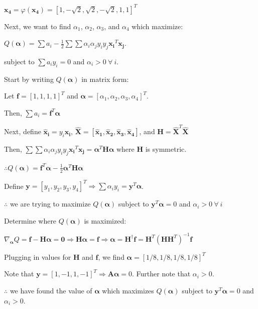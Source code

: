 \documentclass[fleqn]{article}
\begin{document}
\begin{enumerate}
	$\mathbf{x_4} = \varphi(\mathbf{x_4}) = [1,-\sqrt{2},\sqrt{2},-\sqrt{2},1,1]^T$
	
	Next, we want to find $\alpha_1$, $\alpha_2$, $\alpha_3$, and $\alpha_4$ which maximize:
	
	$Q(\boldsymbol{\alpha}) = \sum{a_i} - \frac{1}{2}\sum{\sum{\alpha_i\alpha_jy_iy_j\mathbf{x_i}^T\mathbf{x_j}}}$.
	
	subject to $\sum{a_iy_i} = 0$ and $\alpha_i > 0\ \forall\ i$.
	
	Start by writing $Q(\boldsymbol{\alpha})$ in matrix form:

	Let $\mathbf{f} = [1,1,1,1]^T$ and $\boldsymbol{\alpha} = [\alpha_1, \alpha_2, \alpha_3, \alpha_4]^T$.
	
	Then, $\sum{a_i} = \mathbf{f}^T\boldsymbol{\alpha}$
	
	Next, define $\mathbf{\hat{x}_i} = y_i\mathbf{x_i}$, $\mathbf{\hat{X}} = [\mathbf{\hat{x}_1},\mathbf{\hat{x}_2}, \mathbf{\hat{x}_3}, \mathbf{\hat{x}_4}]$, and $\mathbf{H} = \mathbf{\hat{X}}^T\mathbf{\hat{X}}$
	
	Then, $\sum{\sum{\alpha_i\alpha_jy_iy_j\mathbf{x_i}^T\mathbf{x_j}}} = \boldsymbol{\alpha}^T\mathbf{H}\boldsymbol{\alpha}$ where $\mathbf{H}$ is symmetric.
	
	$\therefore Q(\boldsymbol{\alpha}) = \mathbf{f}^T\boldsymbol{\alpha} - \frac{1}{2}\boldsymbol{\alpha}^T\mathbf{H}\boldsymbol{\alpha}$
	
	Define $\mathbf{y} = [y_1, y_2, y_3, y_4]^T \Rightarrow \sum{\alpha_iy_i} = \mathbf{y}^T\boldsymbol{\alpha}$.
	
	$\therefore$ we are trying to maximize $Q(\boldsymbol{\alpha})$ subject to $\mathbf{y}^T\boldsymbol{\alpha} = 0$ and $\alpha_i > 0\ \forall\ i$
	
	Determine where $Q(\boldsymbol{\alpha})$ is maximized:
	
	$\nabla_{\boldsymbol{\alpha}}Q = \mathbf{f} - \mathbf{H}\boldsymbol{\alpha} = \mathbf{0} \Rightarrow \mathbf{H}\boldsymbol{\alpha} = \mathbf{f} \Rightarrow \boldsymbol{\alpha} = \mathbf{H}^{\dag}\mathbf{f} = \mathbf{H}^T(\mathbf{H}\mathbf{H}^T)^{-1}\mathbf{f}$
	
	Plugging in values for $\mathbf{H}$ and $\mathbf{f}$, we find $\boldsymbol{\alpha} = [1/8,1/8,1/8,1/8]^T$
	
	Note that $\mathbf{y} = [1, -1, 1, -1]^T \Rightarrow \mathbf{A}\boldsymbol{\alpha} = 0$. Further note that $\alpha_i > 0$.
	
	$\therefore$ we have found the value of $\boldsymbol{\alpha}$ which maximizes $Q(\boldsymbol{\alpha})$ subject to \newline $\mathbf{y}^T\boldsymbol{\alpha} = 0$ and $\alpha_i > 0$.
	

\end{enumerate}
\end{document}
